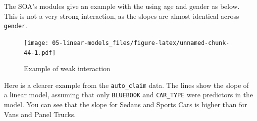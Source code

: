 \documentclass[
  openany]{book}
\newenvironment{Shaded}{\begin{snugshade}}{\end{snugshade}}
\newcommand{\DataTypeTok}[1]{\textcolor[rgb]{0.13,0.29,0.53}{#1}}
\newcommand{\FloatTok}[1]{\textcolor[rgb]{0.00,0.00,0.81}{#1}}
\newcommand{\KeywordTok}[1]{\textcolor[rgb]{0.13,0.29,0.53}{\textbf{#1}}}
\newcommand{\NormalTok}[1]{#1}
\newcommand{\OperatorTok}[1]{\textcolor[rgb]{0.81,0.36,0.00}{\textbf{#1}}}
\newcommand{\StringTok}[1]{\textcolor[rgb]{0.31,0.60,0.02}{#1}}
\begin{document}
The SOA's modules give an example with the using age and gender as below. This is not a very strong interaction, as the slopes are almost identical across \texttt{gender}.

\begin{Shaded}
\end{Shaded}

\begin{figure}
\centering
\texttt{[image: 05-linear-models\_files/figure-latex/unnamed-chunk-44-1.pdf]}
\caption{\label{fig:unnamed-chunk-44}Example of weak interaction}
\end{figure}

Here is a clearer example from the \texttt{auto\_claim} data. The lines show the slope of a linear model, assuming that only \texttt{BLUEBOOK} and \texttt{CAR\_TYPE} were predictors in the model. You can see that the slope for Sedans and Sports Cars is higher than for Vans and Panel Trucks.

\begin{Shaded}
\end{Shaded}
\end{document}
